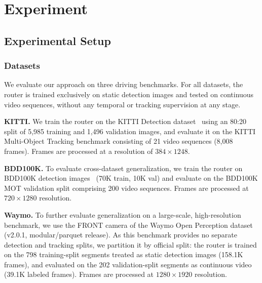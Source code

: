\section{Experiment}
\label{sec:exp}

\subsection{Experimental Setup}

\subsubsection{Datasets}
\label{sec:setup_data}
We evaluate our approach on three driving benchmarks. For all datasets, the router is trained exclusively on static detection images and tested on continuous video sequences, without any temporal or tracking supervision at any stage.

\noindent\textbf{KITTI.} 
We train the router on the KITTI Detection dataset~\cite{geiger2012kitti} using an 80:20 split of 5,985 training and 1,496 validation images, and evaluate it on the KITTI Multi-Object Tracking benchmark consisting of 21 video sequences (8,008 frames). 
Frames are processed at a resolution of $384\times1248$.

\noindent\textbf{BDD100K.} 
To evaluate cross-dataset generalization, we train the router on BDD100K detection images~\cite{yu2020bdd} (70K train, 10K val) and evaluate on the BDD100K MOT validation split comprising 200 video sequences. 
Frames are processed at $720\times1280$ resolution.

\noindent\textbf{Waymo.}
To further evaluate generalization on a large-scale, high-resolution benchmark, we use the FRONT camera of the Waymo Open Perception dataset~\cite{sun2020waymo} (v2.0.1, modular/parquet release). 
As this benchmark provides no separate detection and tracking splits, we partition it by official split: the router is trained on the 798 training-split segments treated as static detection images (158.1K frames), and evaluated on the 202 validation-split segments as continuous video (39.1K labeled frames).
Frames are processed at $1280\times1920$ resolution.


